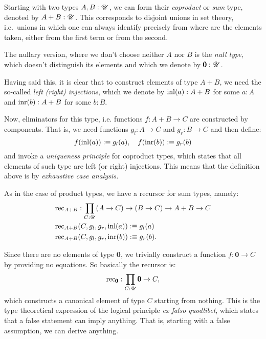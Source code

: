 Starting with two types $ A, B : \mathscr{U} $, we can form their \emph{coproduct}
or \emph{sum} type, denoted by $ A + B : \mathscr{U} $. This corresponds to disjoint
unions in set theory, i.e.\ unions in which one can always identify precisely
from where are the elements taken, either from the first term or from the second\footnotemark.

The nullary version, where we don't choose neither $ A $ nor $ B $ is the
\emph{null type}, which doesn't distinguish its elements and which we denote
by $ \pmb{0} : \mathscr{U} $.

Having said this, it is clear that to construct elements of type $ A + B $,
we need the so-called \emph{left (right) injections}, which we denote by
$ \mathrm{inl}(a) : A + B $ for some $ a : A $ and $ \mathrm{inr}(b) : A + B $
for some $ b : B $.

Now, eliminators for this type, i.e. functions $ f : A + B \to C $ are
constructed by components. That is, we need functions $ g_l : A \to C $
and $ g_r : B \to C $ and then define:
\[
  f(\mathrm{inl}(a)) :\equiv g_l(a), \quad
  f(\mathrm{inr}(b)) :\equiv g_r(b)
\]
and invoke a \emph{uniqueness principle} for coproduct types, which states
that all elements of such type are left (or right) injections. This means
that the definition above is by \emph{exhaustive case analysis.}

As in the case of product types, we have a recursor for sum types,
namely:
\begin{align*}
  &\mathrm{rec}_{A + B} : \prod_{C : \mathscr{U}} (A \to C) \to (B \to C) \to A + B \to C \\
  &\mathrm{rec}_{A + B} (C, g_l, g_r, \mathrm{inl}(a)) :\equiv g_l(a) \\
  &\mathrm{rec}_{A + B} (C, g_l, g_r, \mathrm{inr}(b)) :\equiv g_r(b).
\end{align*}

Since there are no elements of type $ \pmb{0} $, we trivially construct
a function $ f : \pmb{0} \to C $ by providing no equations. So basically
the recursor is:
\[
  \mathrm{rec}_{\pmb{0}} : \prod_{C : \mathscr{U}} \pmb{0} \to C,
\]
which constructs a canonical element of type $ C $ starting from nothing.
This is the type theoretical expression of the logical principle
\emph{ex falso quodlibet}, which states that a false statement can imply
anything. That is, starting with a false assumption, we can derive anything.

